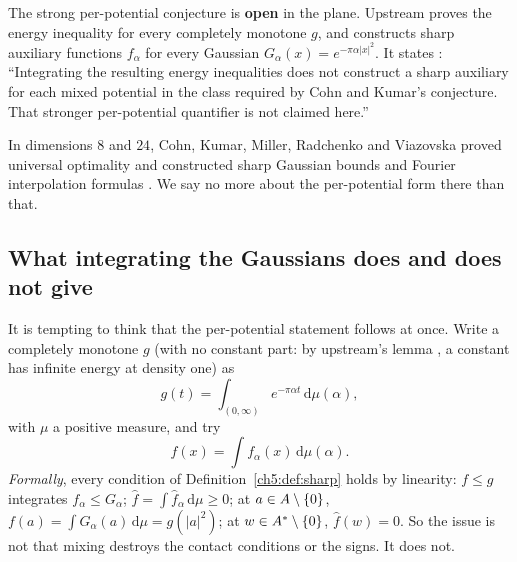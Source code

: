\begin{warnbox}[(status)]
The strong per-potential conjecture is \textbf{open} in the plane. Upstream proves the energy inequality for every
completely monotone $g$, and constructs sharp auxiliary functions $f_\alpha$ for every Gaussian
$G_\alpha(x)=e^{-\pi\alpha|x|^2}$. It states \tierL{}: ``Integrating the resulting energy inequalities does not
construct a sharp auxiliary for each mixed potential in the class required by Cohn and Kumar's conjecture. That
stronger per-potential quantifier is not claimed here.'' \cite[\S1]{oai}
\end{warnbox}

In dimensions $8$ and $24$, Cohn, Kumar, Miller, Radchenko and Viazovska proved universal optimality and constructed
sharp Gaussian bounds and Fourier interpolation formulas \cite[Theorems~1.4, 1.7 and 1.9]{ckmrv}. We say no more
about the per-potential form there than that.

\subsection{What integrating the Gaussians does and does not give}

It is tempting to think that the per-potential statement follows at once. Write a completely monotone $g$ (with no
constant part: by upstream's lemma , a constant has infinite energy at density one) as
\[
g(t)=\int_{(0,\infty)}e^{-\pi\alpha t}\,\mathrm{d}\mu(\alpha),
\]
with $\mu$ a positive measure, and try
\begin{equation}\label{ch5:eq:mixture}
f(x)=\int f_\alpha(x)\,\mathrm{d}\mu(\alpha).
\end{equation}
\emph{Formally}, every condition of Definition~\ref{ch5:def:sharp} holds by linearity: $f\le g$ integrates
$f_\alpha\le G_\alpha$; $\hat f=\int\hat f_\alpha\,\mathrm{d}\mu\ge0$; at $a\in A\setminus\{0\}$,
$f(a)=\int G_\alpha(a)\,\mathrm{d}\mu=g(|a|^2)$; at $w\in A^*\setminus\{0\}$, $\hat f(w)=0$. So the issue is not that
mixing destroys the contact conditions or the signs. It does not.

